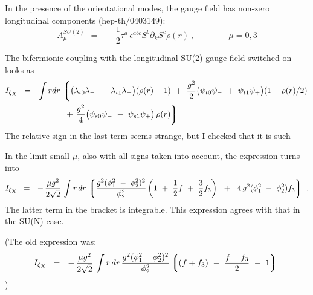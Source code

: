 \documentclass{article}
\newcommand{\p}{\partial}
\newcommand{\lgr}{\left\lgroup}
\newcommand{\rgr}{\right\rgroup}
\begin{document}
In the presence of the orientational modes, the gauge field has non-zero longitudinal
components (hep-th/0403149):
\[
	A^{SU(2)}_\mu ~~=~~ -\,\frac{1}{2}\tau^a\, \epsilon^{abc}S^b \p_k S^c\rho(r) ~,  
		\qquad\qquad  \mu = 0,3
\]
	

The bifermionic coupling with the longitudinal SU(2) gauge field switched on looks as
\begin{align*}
	I_{\zeta\chi} ~~=~~ \int r dr \, & 
			\lgr
			\bigl( \lambda_{t0} \lambda_- ~+~ \lambda_{t1} \lambda_+ \bigr) (\rho(r) - 1) 
			~+~
			\frac{g^2}{2} \bigl( \psi_{t0}\psi_- ~+~ \psi_{t1}\psi_+\bigr)
			(1 - \rho(r)/2)   
			\right.
			\\
%
			& 
			\left.
			~+~
			\frac{g^2}{4} \bigl( \psi_{s0}\psi_- ~-~ \psi_{s1}\psi_+\bigr)\,\rho(r)
			\rgr
\end{align*}
The relative sign in the last term seems strange, but I checked that it is such

In the limit small $\mu$, also with all signs taken into account, the expression turns into
\[
	I_{\zeta\chi} ~~=~~ -\, \frac{\mu g^2}{2\sqrt{2}} \,
			\int r\, dr \,
		\lgr  \frac{ g^2 (\phi_1^2 ~-~ \phi_2^2)^2} {\phi_2^2} 
			    \left( 1 ~+~ \frac{1}{2} f ~+~ \frac{3}{2} f_3 \right) ~~+~~
			4\, g^2 (\phi_1^2 ~-~ \phi_2^2 ) f_3 \rgr ~.
\]
The latter term in the bracket is integrable.
This expression agrees with that in the SU(N) case.


(The old expression was:
\[
	I_{\zeta\chi} ~~=~~ -\,\frac{\mu g^2}{2\sqrt{2}} \, 
			\int r\, dr \, 
			\frac{g^2 (\phi_1^2 - \phi_2^2)^2}{\phi_2^2}
			\lgr (f + f_3) ~-~ \frac{f - f_3}{2} ~-~ 1 \rgr~
\]
\qquad\qquad\qquad\qquad\qquad\qquad\qquad\qquad\qquad\qquad\qquad\qquad\qquad\qquad\qquad\qquad\qquad\qquad)
\end{document}

